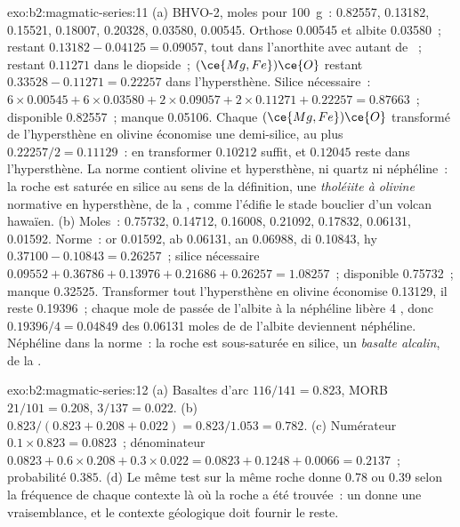\begin{solution}{exo:b2:magmatic-series:11}
(a) BHVO-2, moles pour \qty{100}{g}~:  0.82557,  0.13182, 
0.15521,  0.18007,  0.20328,  0.03580,  0.00545.
Orthose 0.00545 et albite 0.03580~;  restant $0.13182 - 0.04125 = 0.09057$,
tout dans l'anorthite avec autant de ~;  restant $0.11271$ dans le diopside~;
$(\ce{Mg,Fe})\ce{O}$ restant $0.33528 - 0.11271 = 0.22257$ dans l'hypersthène. Silice
nécessaire~: $6\times0.00545 + 6\times0.03580 + 2\times0.09057 + 2\times0.11271 + 0.22257 =
0.87663$~; disponible 0.82557~; manque 0.05106. Chaque $(\ce{Mg,Fe})\ce{O}$ transformé de
l'hypersthène en olivine économise une demi-silice, au plus $0.22257/2 = 0.11129$~: en
transformer $0.10212$ suffit, et $0.12045$ reste dans l'hypersthène. La norme contient
olivine et hypersthène, ni quartz ni néphéline~: la roche est saturée en silice au sens
de la définition, une \emph{tholéiite à olivine} normative en hypersthène, de la , comme l'édifie le stade bouclier d'un volcan hawaïen. (b) Moles~: 0.75732, 0.14712, 0.16008, 0.21092, 0.17832, 0.06131,
0.01592. Norme~: or 0.01592, ab 0.06131, an 0.06988, di 0.10843, hy $0.37100 - 0.10843 =
0.26257$~; silice nécessaire $0.09552 + 0.36786 + 0.13976 + 0.21686 + 0.26257 = 1.08257$~;
disponible 0.75732~; manque 0.32525. Transformer tout l'hypersthène en olivine économise
0.13129, il reste 0.19396~; chaque mole de  passée de l'albite à la néphéline
libère 4 , donc $0.19396/4 = 0.04849$
des 0.06131 moles de  de l'albite deviennent néphéline. Néphéline dans la norme~: la
roche est sous-saturée en silice, un \emph{basalte alcalin}, de la .
\end{solution}

\begin{solution}{exo:b2:magmatic-series:12}
(a) Basaltes d'arc $116/141 = 0.823$, MORB $21/101 = 0.208$, 
$3/137 = 0.022$. (b) $0.823/(0.823 + 0.208 + 0.022) = 0.823/1.053 = 0.782$.
(c) Numérateur $0.1\times0.823 = 0.0823$~; dénominateur $0.0823 + 0.6\times0.208 +
0.3\times0.022 = 0.0823 + 0.1248 + 0.0066 = 0.2137$~; probabilité $0.385$. (d) Le même test sur la même roche
donne 0.78 ou 0.39 selon la fréquence de chaque contexte là où la roche a été trouvée~: un  donne une vraisemblance, et
le contexte géologique doit fournir le reste.
\end{solution}

